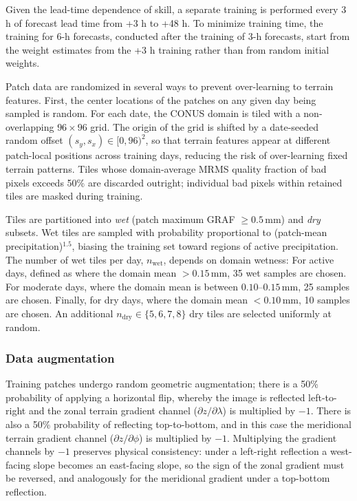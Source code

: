\documentclass[11pt]{article}
\begin{document}
Given the lead-time dependence of skill, a separate training is performed 
every 3 h of forecast lead time from +3 h to +48 h.   To minimize training
time, the training for 6-h forecasts, conducted after the training of 3-h 
forecasts, start from the weight estimates from the +3 h training rather
than from random initial weights.

Patch data are randomized in several ways to prevent over-learning
to terrain features.  First, the center locations of the patches on any given day being
sampled is random.
For each date, the CONUS domain is tiled with a non-overlapping
$96\times96$ grid.  The origin of the grid is shifted by a
date-seeded random offset $(s_y, s_x) \in [0, 96)^2$, so that
terrain features appear at different patch-local positions across
training days, reducing the risk of over-learning fixed terrain
patterns.  Tiles whose domain-average MRMS quality fraction of
bad pixels exceeds 50\% are discarded outright; individual bad
pixels within retained tiles are masked during training.

Tiles are partitioned into \emph{wet} (patch maximum GRAF
$\geq 0.5$\,mm) and \emph{dry} subsets.  Wet tiles are sampled
with probability proportional to (patch-mean precipitation)$^{1.5}$,
biasing the training set toward regions of active precipitation.
The number of wet tiles per day, $n_{\text{wet}}$, depends on
domain wetness:  For active days, defined as where the domain mean $> 0.15$\,mm, 
35 wet samples are chosen.   For moderate days, where the domain mean is between
$0.10$--$0.15$\,mm, 25 samples are chosen. Finally, for dry days,
where the domain mean $< 0.10$\,mm, 10 samples are chosen.
An additional $n_{\text{dry}} \in \{5, 6, 7, 8\}$ dry tiles are
selected uniformly at random.  

\subsubsection{Data augmentation}
\label{sec:augmentation}

Training patches undergo random geometric augmentation; there is a 50\%
probability of applying a horizontal flip, whereby the image is
reflected left-to-right and the zonal terrain gradient
channel ($\partial z / \partial \lambda$) is multiplied by $-1$.
There is also a 50\% probability of reflecting
top-to-bottom, and in this case the meridional terrain gradient
channel ($\partial z / \partial \phi$) is multiplied by $-1$.
Multiplying the gradient channels by $-1$ preserves physical
consistency: under a left-right reflection a west-facing slope
becomes an east-facing slope, so the sign of the zonal gradient
must be reversed, and analogously for the meridional gradient under
a top-bottom reflection.
\end{document}
